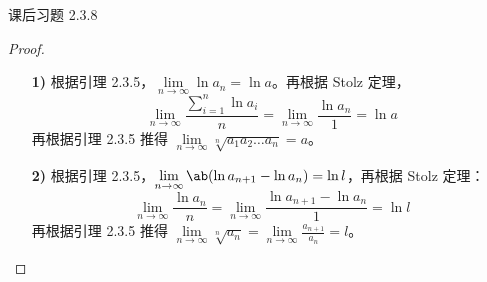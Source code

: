 \begin{problem}
	课后习题 2.3.8

	\begin{proof}
		\begin{enumerate}
			\item[\textbf{1)}] 根据引理 2.3.5，$\lim\limits_{n \to \infty} \ln a_n = \ln a$。再根据 Stolz 定理，
			$$
			\lim_{n \to \infty} \frac{\sum_{i=1}^n \ln a_i}{n} = \lim_{n \to \infty} \frac{\ln a_n}{1} = \ln a
			$$
			再根据引理 2.3.5 推得 $\lim\limits_{n \to \infty} \sqrt[n]{a_1 a_2 \dots a_n} = a$。

			\item[\textbf{2)}] 根据引理 2.3.5，$\lim\limits_{n \to \infty} \ab(\ln a_{n+1} - \ln a_n) = \ln l$，再根据 Stolz 定理：
			$$
			\lim_{n \to \infty} \frac{\ln a_n}{n} = \lim_{n \to \infty} \frac{\ln a_{n+1} - \ln a_n}{1} = \ln l
			$$
			再根据引理 2.3.5 推得 $\lim\limits_{n \to \infty} \sqrt[n]{a_n} = \lim\limits_{n \to \infty} \frac{a_{n+1}}{a_n} = l$。
		\end{enumerate}
	\end{proof}
\end{problem}

